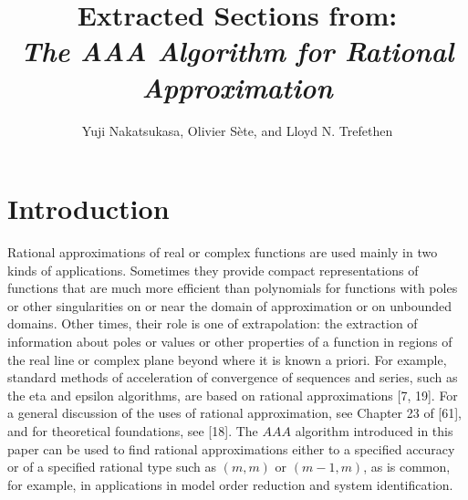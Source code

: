 \documentclass[11pt]{article}
\title{Extracted Sections from: \\ \textit{The AAA Algorithm for Rational Approximation}}
\author{Yuji Nakatsukasa, Olivier Sète, and Lloyd N. Trefethen}
\date{}
\theoremstyle{definition}
\begin{document}
    
    
    
    
\section{Introduction} Rational approximations of real or complex functions are used mainly in two kinds of applications. Sometimes they provide compact representations of functions that are much more efficient than polynomials for functions with poles or other singularities on or near the domain of approximation or on unbounded domains. Other times, their role is one of extrapolation: the extraction of information about poles or values or other properties of a function in regions of the real line or complex plane beyond where it is known a priori. For example, standard methods of acceleration of convergence of sequences and series, such as the eta and epsilon algorithms, are based on rational approximations [7, 19]. For a general discussion of the uses of rational approximation, see Chapter 23 of [61], and for theoretical foundations, see [18]. The $A A A$ algorithm introduced in this paper can be used to find rational approximations either to a specified accuracy or of a specified rational type such as $(m, m)$ or $(m-1, m)$, as is common, for example, in applications in model order reduction and system identification.
    
\end{document}
